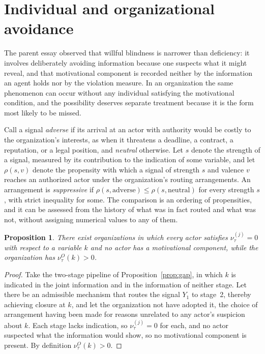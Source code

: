 \documentclass[11pt]{article}
\theoremstyle{plain}
\newtheorem{proposition}{Proposition}
\theoremstyle{definition}
\begin{document}
\section{Individual and organizational avoidance}

The parent essay observed that willful blindness is narrower than deficiency: it involves deliberately avoiding information because one suspects what it might reveal, and that motivational component is recorded neither by the information an agent holds nor by the violation measure. In an organization the same phenomenon can occur without any individual satisfying the motivational condition, and the possibility deserves separate treatment because it is the form most likely to be missed.

Call a signal \emph{adverse} if its arrival at an actor with authority would be costly to the organization's interests, as when it threatens a deadline, a contract, a reputation, or a legal position, and \emph{neutral} otherwise. Let $s$ denote the strength of a signal, measured by its contribution to the indication of some variable, and let $\rho(s,v)$ denote the propensity with which a signal of strength $s$ and valence $v$ reaches an authorized actor under the organization's routing arrangements. An arrangement is \emph{suppressive} if $\rho(s,\text{adverse})\le\rho(s,\text{neutral})$ for every strength $s$, with strict inequality for some. The comparison is an ordering of propensities, and it can be assessed from the history of what was in fact routed and what was not, without assigning numerical values to any of them.

\begin{proposition}\label{prop:institutional}
There exist organizations in which every actor satisfies $\nu^{(j)}_\tau=0$ with respect to a variable $k$ and no actor has a motivational component, while the organization has $\nu^{O}_\tau(k)>0$.
\end{proposition}

\begin{proof}
Take the two-stage pipeline of Proposition~\ref{prop:gap}, in which $k$ is indicated in the joint information and in the information of neither stage. Let there be an admissible mechanism that routes the signal $Y_1$ to stage~2, thereby achieving closure at $k$, and let the organization not have adopted it, the choice of arrangement having been made for reasons unrelated to any actor's suspicion about $k$. Each stage lacks indication, so $\nu^{(j)}_\tau=0$ for each, and no actor suspected what the information would show, so no motivational component is present. By definition $\nu^{O}_\tau(k)>0$.
\end{proof}
\end{document}
